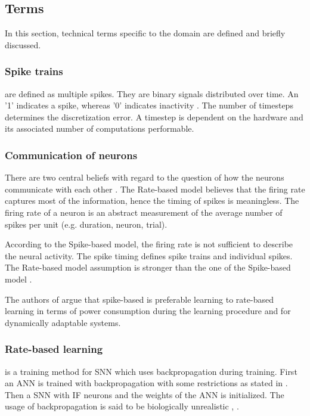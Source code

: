 \newcommand\rbModel{Rate-based model}
\newcommand\sbModel{Spike-based model}
\subsection{Terms}
\label{subsec:terms}

In this section, technical terms specific to the domain are defined and briefly discussed.

\subsubsection{Spike trains}
are defined as multiple spikes.
They are binary signals distributed over time.
An '1' indicates a spike, whereas '0' indicates inactivity \cite{DIET_SNN}.
The number of timesteps determines the discretization error.
A timestep is dependent on the hardware and its associated number of computations performable.

\subsubsection{Communication of neurons}
\label{subsubsec:communication}
There are two central beliefs with regard to the question of how the neurons communicate with each other \cite{spike_vs_rate}.
The \rbModel{} believes that the firing rate captures most of the information, hence the timing of spikes is meaningless.
The firing rate of a neuron is an abstract measurement of the average number of spikes per unit (e.g. duration, neuron, trial).

According to the \sbModel{}, the firing rate is not sufficient to describe the neural activity.
The spike timing defines spike trains and individual spikes.
The \rbModel{} assumption is stronger than the one of the \sbModel{} \cite{spike_vs_rate}.

The authors of \cite{SNN} argue that spike-based is preferable learning to rate-based learning in terms of power consumption 
during the learning procedure and for dynamically adaptable systems.


\subsubsection{Rate-based learning} is a training method for \ac{SNN} which uses backpropagation during training. 
First an \ac{ANN} is trained with backpropagation with some restrictions as stated in \cite{DIET_SNN}.
Then a \ac{SNN} with \ac{IF} neurons and the weights of the \ac{ANN} is initialized.
The usage of backpropagation is said to be biologically unrealistic \cite{SNN}, \cite{STDP_like}.
